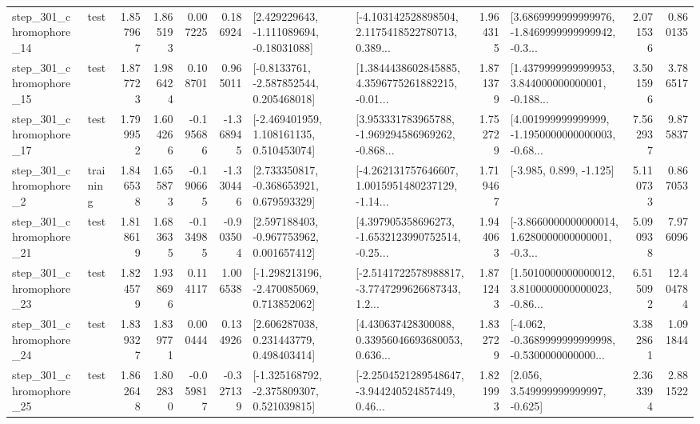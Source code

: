 \begin{tabular}{llrrrrllrlrr}
  step\_301\_chromophore\_14 &      test &      1.857967 &    1.865193 &      0.007225 &  0.186924 &    [2.429229643, -1.111089694, -0.18031088] &  [-4.103142528898504, 2.1175418522780713, 0.389... &       1.964315 &  [3.6869999999999976, -1.8469999999999942, -0.3... &            2.071536 &          0.860135 \\
  step\_301\_chromophore\_15 &      test &      1.877723 &    1.986424 &      0.108701 &  0.965011 &     [-0.8133761, -2.587852544, 0.205468018] &  [1.3844438602845885, 4.3596775261882215, -0.01... &       1.871379 &  [1.4379999999999953, 3.844000000000001, -0.188... &            3.501596 &          3.786517 \\
  step\_301\_chromophore\_17 &      test &      1.799952 &    1.604266 &     -0.195686 & -1.368945 &    [-2.469401959, 1.108161135, 0.510453074] &  [3.953331783965788, -1.969294586969262, -0.868... &       1.752729 &  [4.001999999999999, -1.1950000000000003, -0.68... &            7.562937 &          9.875837 \\
   step\_301\_chromophore\_2 &  training &      1.846538 &    1.655873 &     -0.190665 & -1.330446 &    [2.733350817, -0.368653921, 0.679593329] &  [-4.262131757646607, 1.0015951480237129, -1.14... &       1.719467 &                            [-3.985, 0.899, -1.125] &            5.110733 &          0.867053 \\
  step\_301\_chromophore\_21 &      test &      1.818619 &    1.683635 &     -0.134985 & -0.903504 &    [2.597188403, -0.967753962, 0.001657412] &  [4.397905358696273, -1.6532123990752514, -0.25... &       1.944063 &  [-3.8660000000000014, 1.6280000000000001, -0.3... &            5.090938 &          7.976096 \\
  step\_301\_chromophore\_23 &      test &      1.824579 &    1.938696 &      0.114117 &  1.006538 &   [-1.298213196, -2.470085069, 0.713852062] &  [-2.5141722578988817, -3.7747299626687343, 1.2... &       1.871243 &  [1.5010000000000012, 3.8100000000000023, -0.86... &            6.515092 &         12.404784 \\
  step\_301\_chromophore\_24 &      test &      1.839327 &    1.839771 &      0.000444 &  0.134926 &     [2.606287038, 0.231443779, 0.498403414] &  [4.430637428300088, 0.33956046693680053, 0.636... &       1.832729 &  [-4.062, -0.3689999999999998, -0.5300000000000... &            3.382861 &          1.091844 \\
  step\_301\_chromophore\_25 &      test &      1.862648 &    1.802830 &     -0.059817 & -0.327139 &   [-1.325168792, -2.375809307, 0.521039815] &  [-2.2504521289548647, -3.944240524857449, 0.46... &       1.821993 &                 [2.056, 3.549999999999997, -0.625] &            2.363394 &          2.881522 \\

\end{tabular}
